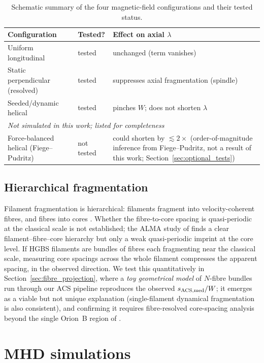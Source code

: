 \documentclass[usenatbib,twoside,twocolumn]{mnras}
\begin{document}
\begin{table}
\caption{Schematic summary of the four magnetic-field configurations and their tested status.}
\label{tab:magcases}
\footnotesize
\setlength{\tabcolsep}{4pt}
\begin{tabular}{@{}p{2.9cm}lp{3.0cm}@{}}
\toprule
Configuration & Tested? & Effect on axial $\lambda$ \\
\midrule
Uniform longitudinal & tested & unchanged (term vanishes) \\
Static perpendicular (resolved) & tested & suppresses axial fragmentation (spindle) \\
Seeded/dynamic helical & tested & pinches $W$; does not shorten $\lambda$ \\
\midrule
\multicolumn{3}{l}{\emph{Not simulated in this work; listed for completeness}}\\
Force-balanced helical (Fiege--Pudritz) & not tested & could shorten by $\lesssim2\times$ (order-of-magnitude inference from Fiege--Pudritz, not a result of this work; Section~\ref{sec:optional_tests}) \\
\bottomrule
\end{tabular}
\end{table}

\subsection{Hierarchical fragmentation}

Filament fragmentation is hierarchical: filaments fragment into velocity-coherent fibres, and fibres into cores \citep{Hacar2013,Hacar2018,Yang2024}. Whether the fibre-to-core spacing is quasi-periodic at the classical scale is not established; the ALMA study of \citet{Yang2024} finds a clear filament--fibre--core hierarchy but only a weak quasi-periodic imprint at the core level. If HGBS filaments are bundles of fibres each fragmenting near the classical scale, measuring core spacings across the whole filament compresses the apparent spacing, in the observed direction. We test this quantitatively in Section~\ref{sec:fibre_projection}, where a \emph{toy geometrical model} of $N$-fibre bundles run through our ACS pipeline reproduces the observed $s_{\rm ACS,med}/W$; it emerges as a viable but not unique explanation (single-filament dynamical fragmentation is also consistent), and confirming it requires fibre-resolved core-spacing analysis beyond the single Orion~B region of \citet{Yang2024}.

\section{MHD simulations}
\label{sec:sims}
\end{document}
